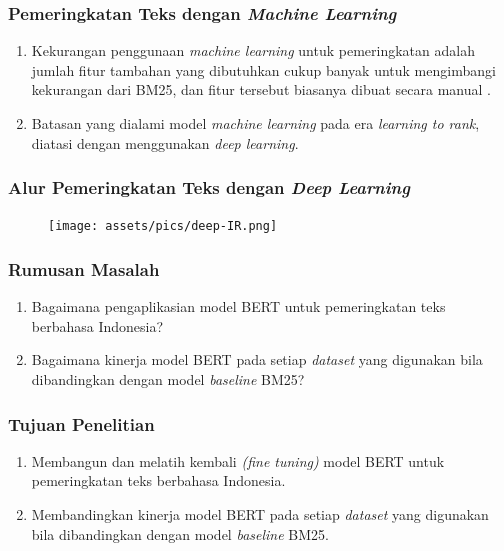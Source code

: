 \documentclass{beamer}
\newcommand{\f}[1]{\textit{#1}}
\begin{document}
\begin{frame}
    \frametitle{Pemeringkatan Teks dengan \f{Machine Learning}}
    \begin{enumerate}
        \item Kekurangan penggunaan \f{machine learning} untuk pemeringkatan adalah jumlah fitur tambahan yang dibutuhkan cukup banyak untuk mengimbangi kekurangan dari BM25, dan fitur tersebut biasanya dibuat secara manual \citep{textrankingsurvey}.
        \item Batasan yang dialami model \f{machine learning} pada era \f{learning to rank}, diatasi dengan menggunakan \f{deep learning}.
    \end{enumerate}

\end{frame}

\begin{frame}
    \frametitle{Alur Pemeringkatan Teks dengan \f{Deep Learning}}
    \begin{figure}
        \centering
        \texttt{[image: assets/pics/deep-IR.png]}
    \end{figure}
\end{frame}

\begin{frame}

    
\end{frame}

\begin{frame}
\frametitle{Rumusan Masalah}

\begin{enumerate}
	\item Bagaimana pengaplikasian model BERT untuk pemeringkatan teks berbahasa Indonesia?
	\item Bagaimana kinerja model BERT pada setiap \f{dataset} yang digunakan bila dibandingkan dengan model \f{baseline} BM25?
\end{enumerate}

\end{frame}

\begin{frame}
    \frametitle{Tujuan Penelitian}
    \begin{enumerate}
        \item Membangun dan melatih kembali \f{(fine tuning)} model BERT untuk pemeringkatan teks berbahasa Indonesia.
        \item Membandingkan kinerja model BERT pada setiap \f{dataset} yang digunakan bila dibandingkan dengan model \f{baseline} BM25.
    \end{enumerate}
\end{frame}
\end{document}
